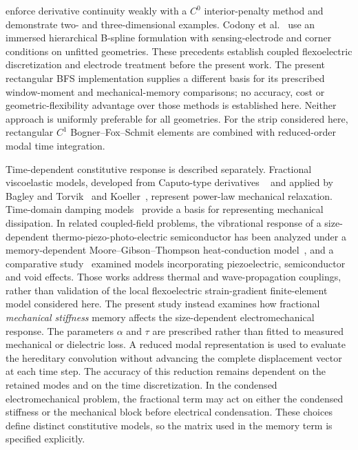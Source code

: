 \cite{VenturaCodonyFernandez2021} enforce derivative continuity weakly with
a $C^0$ interior-penalty method and demonstrate two- and three-dimensional
examples. Codony et al.~\cite{CodonyMarcoFernandezArias2019} use an immersed
hierarchical B-spline formulation with sensing-electrode and corner conditions
on unfitted geometries. These precedents establish coupled flexoelectric
discretization and electrode treatment before the present work. The present
rectangular BFS implementation supplies a different basis for its prescribed
window-moment and mechanical-memory comparisons; no accuracy, cost or
geometric-flexibility advantage over those methods is established here.
Neither approach is uniformly preferable for all geometries. For the strip considered here, rectangular $C^1$ Bogner--Fox--Schmit
elements are combined with reduced-order modal time integration.

Time-dependent constitutive response is described separately.
Fractional viscoelastic models, developed from Caputo-type derivatives
~\cite{Caputo1967} and applied by Bagley and Torvik~\cite{BagleyTorvik1983}
and Koeller~\cite{Koeller1984}, represent power-law mechanical relaxation.
Time-domain damping models~\cite{EnelundLesieutre1999} provide a basis for
representing mechanical dissipation. In related coupled-field problems,
the vibrational response of a size-dependent thermo-piezo-photo-electric
semiconductor has been analyzed under a memory-dependent
Moore--Gibson--Thompson heat-conduction model~\cite{Gupta2024Vibrational}, and a
comparative study~\cite{Gupta2025Piezo} examined models incorporating
piezoelectric, semiconductor and void effects. Those works address thermal and
wave-propagation couplings, rather than validation of the local flexoelectric
strain-gradient finite-element model considered here. The present study instead
examines how fractional \emph{mechanical stiffness} memory affects the
size-dependent electromechanical response. The parameters $\alpha$ and $\tau$ are prescribed rather than fitted to
measured mechanical or dielectric loss. A reduced modal representation is used to evaluate the hereditary convolution
without advancing the complete displacement vector at each time step. The
accuracy of this reduction remains dependent on the retained modes and on the
time discretization. In the condensed electromechanical problem, the
fractional term may act on either the condensed stiffness or the mechanical
block before electrical condensation. These choices define distinct constitutive models, so the matrix
used in the memory term is specified explicitly.

